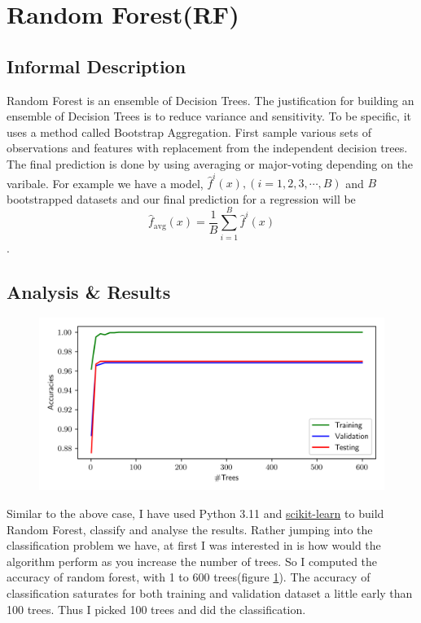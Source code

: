\documentclass{article}
\begin{document}
\section{Random Forest(RF)}
\subsection{Informal Description}
Random Forest is an ensemble of Decision Trees. The justification for building an ensemble 
of Decision Trees is to reduce variance and sensitivity. To be specific, it uses a method called
Bootstrap Aggregation. First sample various sets of  observations and features with replacement from the    
independent decision trees. The final prediction is done by using averaging or major-voting depending 
on the varibale.  For example we have a model,  $\hat{f}^i(x),(i = 1,2,3, \cdots, B)$ and $B$ bootstrapped 
datasets and our final prediction for a regression will be
\[
\hat{f}_{\text{avg}}(x) = \frac{1}{B}\sum_{i=1}^B \hat{f}^i(x)
\]. 

\subsection{Analysis \& Results}
\begin{figure}
    \centering
    \includegraphics[scale=.75]{RF_acc_tree.png}
    \label{fig:treeacc}
    \caption{}
\end{figure}
Similar to the above case, I have used Python 3.11 and \href{https://scihttps://scikit-learn.org/}{scikit-learn}
to build Random Forest, classify and analyse the results. Rather jumping into the classification problem we have, 
at first I was interested in is how would the algorithm perform as you increase the number of trees. So I computed 
the accuracy of random forest, with 1 to 600 trees(figure \ref{fig:treeacc}). The accuracy of classification saturates
for both training and validation dataset a little early than 100 trees. Thus I picked 100 trees and did the classification. 
\end{document}
